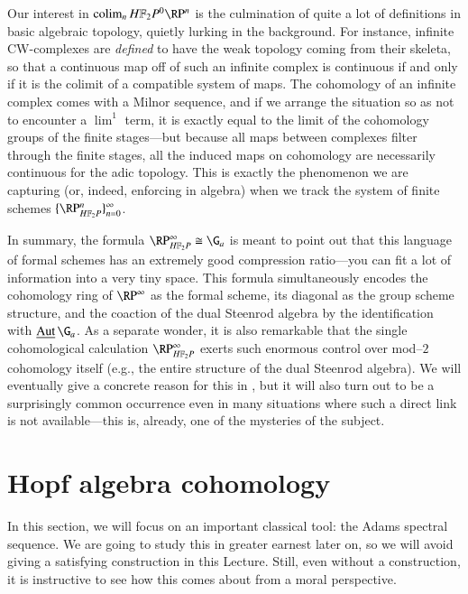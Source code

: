 \begin{remark}
Our interest in $\colim_n \HFtwo P^0 \RP^n$ is the culmination of quite a lot of definitions in basic algebraic topology, quietly lurking in the background.  For instance, infinite CW-complexes are \emph{defined} to have the weak topology coming from their skeleta, so that a continuous map off of such an infinite complex is continuous if and only if it is the colimit of a compatible system of maps.  The cohomology of an infinite complex comes with a Milnor sequence, and if we arrange the situation so as not to encounter a $\lim^1$ term, it is exactly equal to the limit of the cohomology groups of the finite stages---but because all maps between complexes filter through the finite stages, all the induced maps on cohomology are necessarily continuous for the adic topology.  This is exactly the phenomenon we are capturing (or, indeed, enforcing in algebra) when we track the system of finite schemes $\{\RP^n_{\HFtwo P}\}_{n=0}^\infty$.
\end{remark}

In summary, the formula $\RP^\infty_{\HFtwo P} \cong \G_a$ is meant to point out that this language of formal schemes has an extremely good compression ratio---you can fit a lot of information into a very tiny space.  This formula simultaneously encodes the cohomology ring of $\RP^\infty$ as the formal scheme, its diagonal as the group scheme structure, and the coaction of the dual Steenrod algebra by the identification with $\InternalAut{\G_a}$.  As a separate wonder, it is also remarkable that the single cohomological calculation $\RP^\infty_{\HFtwo P}$ exerts such enormous control over mod--$2$ cohomology itself (e.g., the entire structure of the dual Steenrod algebra).  We will eventually give a concrete reason for this in , but it will also turn out to be a surprisingly common occurrence even in many situations where such a direct link is not available---this is, already, one of the mysteries of the subject.








\vspace{-2\baselineskip}\section{Hopf algebra cohomology}\label{HopfAlgebraLecture}

In this section, we will focus on an important classical tool: the Adams spectral sequence.  We are going to study this in greater earnest later on, so we will avoid giving a satisfying construction in this Lecture.  Still, even without a construction, it is instructive to see how this comes about from a moral perspective.

